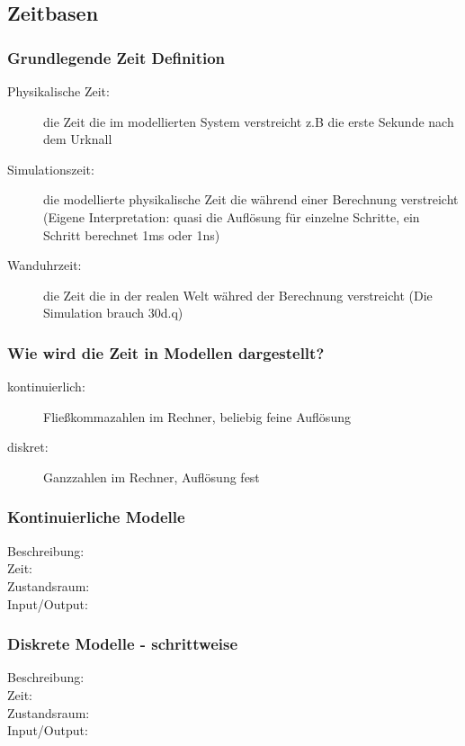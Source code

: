 \documentclass[11pt, fleqn, a4paper, leqno]{scrartcl} %
\begin{document}
	\subsection{Zeitbasen}
		\subsubsection{Grundlegende Zeit Definition}
			\begin{description}
				\item[Physikalische Zeit:] die Zeit die im modellierten System verstreicht z.B die erste Sekunde nach dem Urknall
				\item[Simulationszeit:] die modellierte physikalische Zeit die während einer Berechnung verstreicht (Eigene Interpretation: quasi die Auflösung für einzelne Schritte, ein Schritt berechnet 1ms oder 1ns)
				\item[Wanduhrzeit:] die Zeit die in der realen Welt währed der Berechnung verstreicht (Die Simulation brauch 30d.q)
			\end{description}
		\subsubsection{Wie wird die Zeit in Modellen dargestellt?}
			\begin{description}
				\item[kontinuierlich:] Fließkommazahlen im Rechner, beliebig feine Auflösung
				\item[diskret:] Ganzzahlen im Rechner, Auflösung fest
			\end{description}
		\subsubsection{Kontinuierliche Modelle}
			\begin{description}
				\item[Beschreibung:]
				\item[Zeit:]
				\item[Zustandsraum:]
				\item[Input/Output:]
			\end{description}
		\subsubsection{Diskrete Modelle - schrittweise}
			\begin{description}
				\item[Beschreibung:]
				\item[Zeit:]
				\item[Zustandsraum:]
				\item[Input/Output:]
			\end{description}
\end{document}
